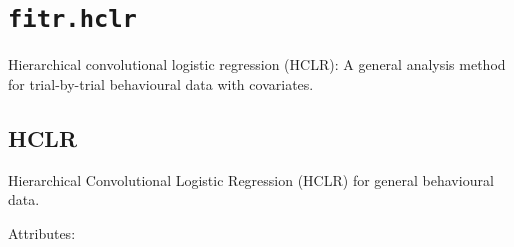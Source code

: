 \section{\texorpdfstring{\texttt{fitr.hclr}}{fitr.hclr}}\label{fitr.hclr}

Hierarchical convolutional logistic regression (HCLR): A general
analysis method for trial-by-trial behavioural data with covariates.

\subsection{HCLR}\label{hclr}

\begin{Shaded}
\begin{Highlighting}[]
\end{Highlighting}
\end{Shaded}

Hierarchical Convolutional Logistic Regression (HCLR) for general
behavioural data.

Attributes:

